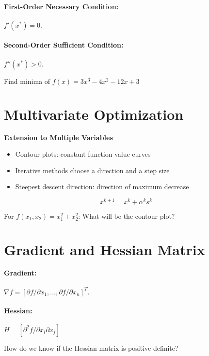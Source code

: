 \documentclass[11pt,a4paper]{article}
\theoremstyle{definition}
\begin{document}
\paragraph{First-Order Necessary Condition:} $f'(x^\ast)=0$.  
\paragraph{Second-Order Sufficient Condition:} $f''(x^\ast)>0$.  

\begin{quesbox}[Example]
Find minima of $f(x)=3x^3-4x^2-12x+3$
\end{quesbox}

\section*{Multivariate Optimization }

\textbf{Extension to Multiple Variables}
\begin{itemize}
  \item Contour plots: constant function value curves
  \item Iterative methods choose a direction and a step size
  \item Steepest descent direction: direction of maximum decrease
\end{itemize}

\[
x^{k+1} = x^k + \alpha^k s^k
\]


\begin{quesbox}
For $f(x_1,x_2)=x_1^2+x_2^2$: What will be the contour plot?
\end{quesbox}

\section*{Gradient and Hessian Matrix}

\paragraph{Gradient:} $\nabla f = [\partial f/\partial x_1,...,\partial f/\partial x_n]^T$.  
\paragraph{Hessian:} $H = [\partial^2 f/\partial x_i \partial x_j]$ 
\begin{quesbox}
  How do we know if the Hessian matrix is positive definite?
\end{quesbox}
\end{document}
